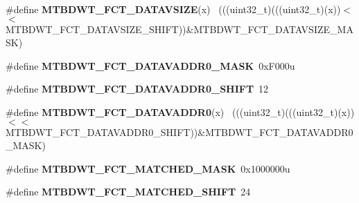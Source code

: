 \begin{DoxyCompactItemize}
\item 
\hypertarget{group___m_t_b_d_w_t___register___masks_ga6d8fb6f1b8bbb5ccea5e7666d69a6c2c}{}\#define {\bfseries M\+T\+B\+D\+W\+T\+\_\+\+F\+C\+T\+\_\+\+D\+A\+T\+A\+V\+S\+I\+Z\+E}(x)                                ~(((uint32\+\_\+t)(((uint32\+\_\+t)(x))$<$$<$M\+T\+B\+D\+W\+T\+\_\+\+F\+C\+T\+\_\+\+D\+A\+T\+A\+V\+S\+I\+Z\+E\+\_\+\+S\+H\+I\+F\+T))\&M\+T\+B\+D\+W\+T\+\_\+\+F\+C\+T\+\_\+\+D\+A\+T\+A\+V\+S\+I\+Z\+E\+\_\+\+M\+A\+S\+K)\label{group___m_t_b_d_w_t___register___masks_ga6d8fb6f1b8bbb5ccea5e7666d69a6c2c}

\item 
\hypertarget{group___m_t_b_d_w_t___register___masks_ga75b2d3a8190ba867f64fd6dfe5454bdf}{}\#define {\bfseries M\+T\+B\+D\+W\+T\+\_\+\+F\+C\+T\+\_\+\+D\+A\+T\+A\+V\+A\+D\+D\+R0\+\_\+\+M\+A\+S\+K}~0x\+F000u\label{group___m_t_b_d_w_t___register___masks_ga75b2d3a8190ba867f64fd6dfe5454bdf}

\item 
\hypertarget{group___m_t_b_d_w_t___register___masks_gaafd0b0f0d3b07005320d859fa2d3ce30}{}\#define {\bfseries M\+T\+B\+D\+W\+T\+\_\+\+F\+C\+T\+\_\+\+D\+A\+T\+A\+V\+A\+D\+D\+R0\+\_\+\+S\+H\+I\+F\+T}~12\label{group___m_t_b_d_w_t___register___masks_gaafd0b0f0d3b07005320d859fa2d3ce30}

\item 
\hypertarget{group___m_t_b_d_w_t___register___masks_ga3e1ac229cfaa4bfb0c0eb399b29ae207}{}\#define {\bfseries M\+T\+B\+D\+W\+T\+\_\+\+F\+C\+T\+\_\+\+D\+A\+T\+A\+V\+A\+D\+D\+R0}(x)                              ~(((uint32\+\_\+t)(((uint32\+\_\+t)(x))$<$$<$M\+T\+B\+D\+W\+T\+\_\+\+F\+C\+T\+\_\+\+D\+A\+T\+A\+V\+A\+D\+D\+R0\+\_\+\+S\+H\+I\+F\+T))\&M\+T\+B\+D\+W\+T\+\_\+\+F\+C\+T\+\_\+\+D\+A\+T\+A\+V\+A\+D\+D\+R0\+\_\+\+M\+A\+S\+K)\label{group___m_t_b_d_w_t___register___masks_ga3e1ac229cfaa4bfb0c0eb399b29ae207}

\item 
\hypertarget{group___m_t_b_d_w_t___register___masks_ga7d1a477cd50c957daaeabd24ae8a2092}{}\#define {\bfseries M\+T\+B\+D\+W\+T\+\_\+\+F\+C\+T\+\_\+\+M\+A\+T\+C\+H\+E\+D\+\_\+\+M\+A\+S\+K}~0x1000000u\label{group___m_t_b_d_w_t___register___masks_ga7d1a477cd50c957daaeabd24ae8a2092}

\item 
\hypertarget{group___m_t_b_d_w_t___register___masks_ga50433f9cbc4ffe91e3fe13b764bb78a9}{}\#define {\bfseries M\+T\+B\+D\+W\+T\+\_\+\+F\+C\+T\+\_\+\+M\+A\+T\+C\+H\+E\+D\+\_\+\+S\+H\+I\+F\+T}~24\label{group___m_t_b_d_w_t___register___masks_ga50433f9cbc4ffe91e3fe13b764bb78a9}


\end{DoxyCompactItemize}
